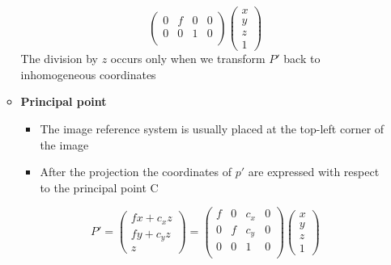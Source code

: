 \documentclass{article}
\begin{document}
\begin{itemize}
\begin{itemize}
\[\begin{pmatrix}
            0 & f & 0 & 0\\
            0 & 0 & 1 & 0\\
        \end{pmatrix} \begin{pmatrix}
            x \\ y \\ z \\ 1
        \end{pmatrix}\]
        The division by \(z\) occurs only when we transform \(P'\) back to inhomogeneous coordinates
        \item \textbf{Principal point}
        \begin{itemize}
            \item The image reference system is usually placed at the top-left corner of the image
            \item After the projection the coordinates of \(p'\) are expressed with respect to the principal point C
        \end{itemize}
        \[P' = \begin{pmatrix}
            fx + c_xz \\ fy + c_yz \\ z
        \end{pmatrix} = \begin{pmatrix}
            f & 0 & c_x & 0\\
            0 & f & c_y & 0\\
            0 & 0 & 1 & 0\\
        \end{pmatrix} \begin{pmatrix}
            x \\ y \\ z \\ 1
        \end{pmatrix}\]



\end{itemize}
\end{itemize}
\end{document}
